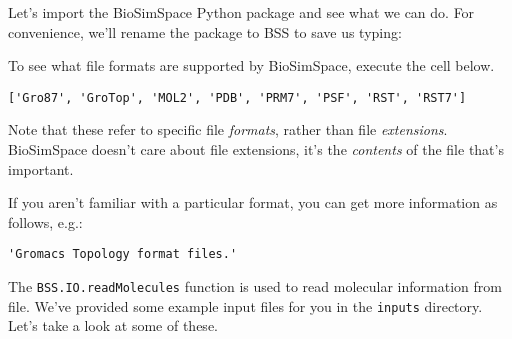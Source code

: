 Let's import the BioSimSpace Python package and see what we can do. For
convenience, we'll rename the package to BSS to save us typing:

\begin{Shaded}
\begin{Highlighting}[]
\end{Highlighting}
\end{Shaded}

To see what file formats are supported by BioSimSpace, execute the cell
below.

\begin{Shaded}
\begin{Highlighting}[]
\end{Highlighting}
\end{Shaded}

\begin{verbatim}
['Gro87', 'GroTop', 'MOL2', 'PDB', 'PRM7', 'PSF', 'RST', 'RST7']
\end{verbatim}

Note that these refer to specific file \emph{formats}, rather than file
\emph{extensions}. BioSimSpace doesn't care about file extensions, it's
the \emph{contents} of the file that's important.

If you aren't familiar with a particular format, you can get more
information as follows, e.g.:

\begin{Shaded}
\begin{Highlighting}[]
\NormalTok{)}
\end{Highlighting}
\end{Shaded}

\begin{verbatim}
'Gromacs Topology format files.'
\end{verbatim}

The \texttt{BSS.IO.readMolecules} function is used to read molecular
information from file. We've provided some example input files for you
in the \texttt{inputs} directory. Let's take a look at some of these.

\begin{Shaded}
\begin{Highlighting}[]
\OperatorTok{!}
\end{Highlighting}
\end{Shaded}

